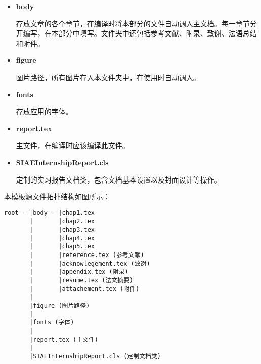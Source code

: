 \begin{itemize}
    \item {\bfseries body}

    存放文章的各个章节，在编译时将本部分的文件自动调入主文档。每一章节分开编写，在本部分中填写。文件夹中还包括参考文献、附录、致谢、法语总结和附件。

    \item {\bfseries figure}

    图片路径，所有图片存入本文件夹中，在使用时自动调入。

    \item {\bfseries fonts}

    存放应用的字体。

    \item {\bfseries report.tex}

    主文件，在编译时应该编译此文件。

    \item {\bfseries SIAEInternshipReport.cls}

    定制的实习报告文档类，包含文档基本设置以及封面设计等操作。

\end{itemize}

本模板源文件拓扑结构如图所示：

\begin{Verbatim}[frame=single, framesep=5mm, samepage=false, baselinestretch=1.0]
root --|body --|chap1.tex
       |       |chap2.tex
       |       |chap3.tex
       |       |chap4.tex
       |       |chap5.tex
       |       |reference.tex (参考文献)
       |       |acknowlegement.tex (致谢)
       |       |appendix.tex (附录)
       |       |resume.tex (法文摘要)
       |       |attachement.tex (附件)
       |
       |figure (图片路径)
       |
       |fonts (字体)
       |
       |report.tex (主文件)
       |
       |SIAEInternshipReport.cls (定制文档类)
\end{Verbatim}

